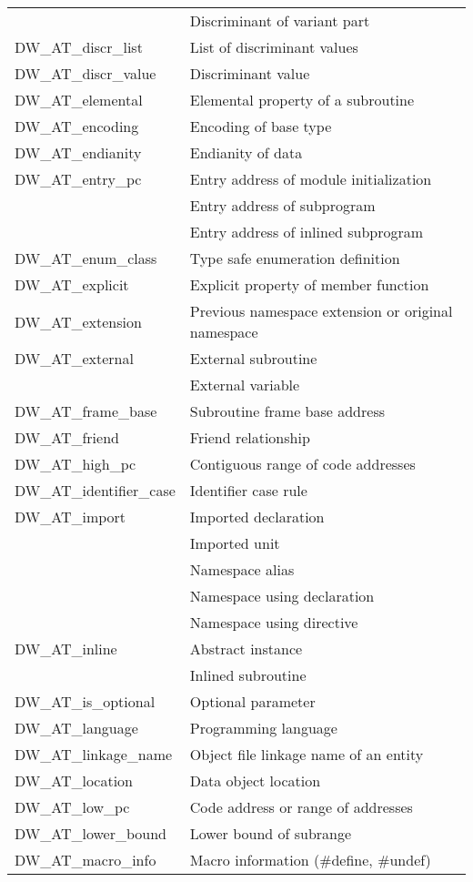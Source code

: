 \begin{longtable}{l|p{9cm}}
&Discriminant of variant part\\
DW\_AT\_discr\_list
&List of discriminant values\\
DW\_AT\_discr\_value
&Discriminant value\\
DW\_AT\_elemental
&Elemental property of a subroutine\\
DW\_AT\_encoding
&Encoding of base type\\
DW\_AT\_endianity
&Endianity of data\\
DW\_AT\_entry\_pc
&Entry address of module initialization\\
&Entry address of subprogram\\
&Entry address of inlined subprogram\\
DW\_AT\_enum\_class
&Type safe enumeration definition\\
DW\_AT\_explicit
&Explicit property of member function\\
DW\_AT\_extension
&Previous namespace extension or original namespace\\
DW\_AT\_external
&External subroutine\\
&External variable\\
DW\_AT\_frame\_base
&Subroutine frame base address\\
DW\_AT\_friend
&Friend relationship\\
DW\_AT\_high\_pc
&Contiguous range of code addresses\\
DW\_AT\_identifier\_case
&Identifier case rule \\
DW\_AT\_import
&Imported declaration \\
&Imported unit \\
&Namespace alias \\
&Namespace using declaration \\
&Namespace using directive \\
DW\_AT\_inline
&Abstract instance\\
&Inlined subroutine\\
DW\_AT\_is\_optional
&Optional parameter\\
DW\_AT\_language
&Programming language\\
DW\_AT\_linkage\_name
&Object file linkage name of an entity\\
DW\_AT\_location
&Data object location\\
DW\_AT\_low\_pc
&Code address or range of addresses\\
DW\_AT\_lower\_bound
&Lower bound of subrange\\
DW\_AT\_macro\_info
&Macro information (\#define, \#undef)\\

\end{longtable}
